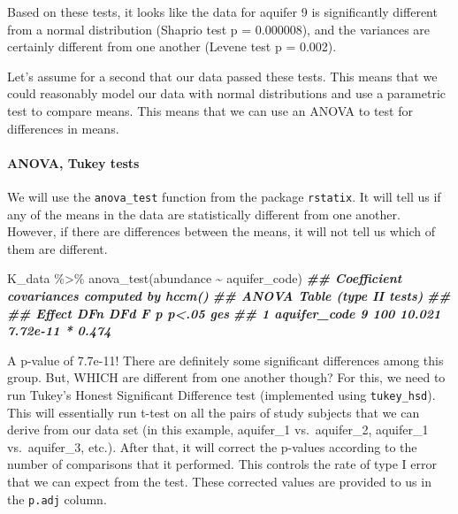 \documentclass[
]{krantz}
\newenvironment{Shaded}{\begin{snugshade}}{\end{snugshade}}
\newcommand{\DocumentationTok}[1]{\textcolor[rgb]{0.56,0.35,0.01}{\textbf{\textit{#1}}}}
\newcommand{\FunctionTok}[1]{\textcolor[rgb]{0.00,0.00,0.00}{#1}}
\newcommand{\NormalTok}[1]{#1}
\newcommand{\SpecialCharTok}[1]{\textcolor[rgb]{0.00,0.00,0.00}{#1}}
\begin{document}
Based on these tests, it looks like the data for aquifer 9 is significantly different from a normal distribution (Shaprio test p = 0.000008), and the variances are certainly different from one another (Levene test p = 0.002).

Let's assume for a second that our data passed these tests. This means that we could reasonably model our data with normal distributions and use a parametric test to compare means. This means that we can use an ANOVA to test for differences in means.

\hypertarget{anova-tukey-tests}{%
\paragraph{ANOVA, Tukey tests}\label{anova-tukey-tests}}

We will use the \texttt{anova\_test} function from the package \texttt{rstatix}. It will tell us if any of the means in the data are statistically different from one another. However, if there are differences between the means, it will not tell us which of them are different.

\begin{Shaded}
\begin{Highlighting}[]
\NormalTok{K\_data }\SpecialCharTok{\%\textgreater{}\%}
  \FunctionTok{anova\_test}\NormalTok{(abundance }\SpecialCharTok{\textasciitilde{}}\NormalTok{ aquifer\_code)}
\DocumentationTok{\#\# Coefficient covariances computed by hccm()}
\DocumentationTok{\#\# ANOVA Table (type II tests)}
\DocumentationTok{\#\# }
\DocumentationTok{\#\#         Effect DFn DFd      F        p p\textless{}.05   ges}
\DocumentationTok{\#\# 1 aquifer\_code   9 100 10.021 7.72e{-}11     * 0.474}
\end{Highlighting}
\end{Shaded}

A p-value of 7.7e-11! There are definitely some significant differences among this group. But, WHICH are different from one another though? For this, we need to run Tukey's Honest Significant Difference test (implemented using \texttt{tukey\_hsd}). This will essentially run t-test on all the pairs of study subjects that we can derive from our data set (in this example, aquifer\_1 vs.~aquifer\_2, aquifer\_1 vs.~aquifer\_3, etc.). After that, it will correct the p-values according to the number of comparisons that it performed. This controls the rate of type I error that we can expect from the test. These corrected values are provided to us in the \texttt{p.adj} column.
\end{document}

